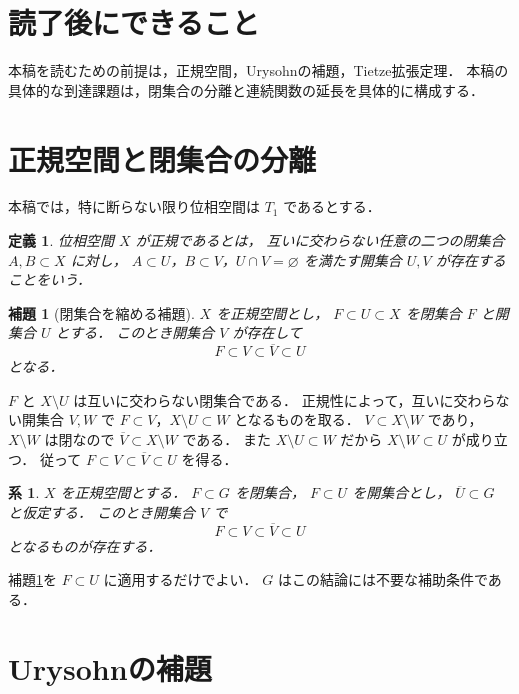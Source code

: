 \documentclass[a5paper,10pt,onecolumn]{jsarticle}
\makeatletter
\theoremstyle{mathnotetheorem}
\newtheorem{definition}[theorem]{定義}
\newtheorem{lemma}[theorem]{補題}
\newtheorem{corollary}[theorem]{系}
\renewcommand{\proofname}{証明}
\renewenvironment{proof}[1][\proofname]{%
  \par\pushQED{\qed}\normalfont\topsep4\p@\@plus2\p@\relax
  \trivlist\item[\hskip\labelsep\bfseries #1]\ignorespaces
}{\popQED\endtrivlist\@endpefalse}
\makeatother
\begin{document}
\section*{読了後にできること}
本稿を読むための前提は，正規空間，Urysohnの補題，Tietze拡張定理．
本稿の具体的な到達課題は，閉集合の分離と連続関数の延長を具体的に構成する．

\section{正規空間と閉集合の分離}

本稿では，特に断らない限り位相空間は $T_1$ であるとする．
\begin{definition}
位相空間 $X$ が\emph{正規}であるとは，
互いに交わらない任意の二つの閉集合 $A,B\subset X$ に対し，
$A\subset U$，$B\subset V$，$U\cap V=\varnothing$
を満たす開集合 $U,V$ が存在することをいう．
\end{definition}

\begin{lemma}[閉集合を縮める補題]\label{lem:shrink}
$X$ を正規空間とし，
$F\subset U\subset X$ を閉集合 $F$ と開集合 $U$ とする．
このとき開集合 $V$ が存在して
\[
 F\subset V\subset\overline V\subset U
\]
となる．
\end{lemma}
\begin{proof}
$F$ と $X\setminus U$ は互いに交わらない閉集合である．
正規性によって，互いに交わらない開集合 $V,W$ で
$F\subset V$，$X\setminus U\subset W$ となるものを取る．
$V\subset X\setminus W$ であり，$X\setminus W$ は閉なので
$\overline V\subset X\setminus W$ である．
また $X\setminus U\subset W$ だから
$X\setminus W\subset U$ が成り立つ．
従って $F\subset V\subset\overline V\subset U$ を得る．
\end{proof}

\begin{corollary}\label{cor:shrink-chain}
$X$ を正規空間とする．
$F\subset G$ を閉集合，
$F\subset U$ を開集合とし，
$\overline U\subset G$ と仮定する．
このとき開集合 $V$ で
\[
 F\subset V\subset\overline V\subset U
\]
となるものが存在する．
\end{corollary}
\begin{proof}
補題\ref{lem:shrink}を $F\subset U$ に適用するだけでよい．
$G$ はこの結論には不要な補助条件である．
\end{proof}

\section{Urysohnの補題}
\end{document}
